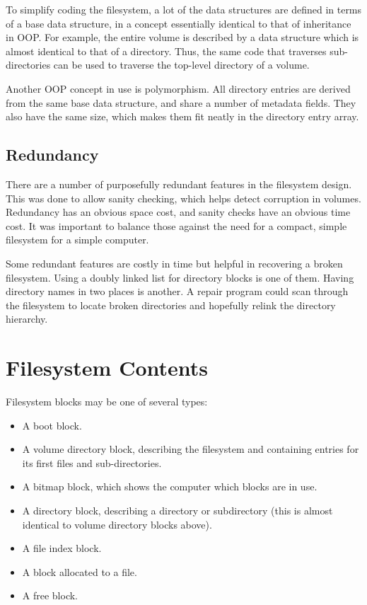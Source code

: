 To simplify coding the filesystem, a lot of the data structures are defined in
terms of a base data structure, in a concept essentially identical to that of
inheritance in \gls{OOP}. For example, the entire volume is
described by a data structure which is almost identical to that of a
directory. Thus, the same code that traverses sub-directories can be used to
traverse the top-level directory of a volume.

Another \gls{OOP} concept in use is polymorphism. All directory entries are
derived from the same base data structure, and share a number of metadata
fields. They also have the same size, which makes them fit neatly in the
directory entry array.

\subsection{Redundancy}

There are a number of purposefully redundant features in the filesystem
design. This was done to allow sanity checking, which helps detect corruption
in volumes. Redundancy has an obvious space cost, and sanity checks have an
obvious time cost. It was important to balance those against the need for a
compact, simple filesystem for a simple computer.

Some redundant features are costly in time but helpful in recovering a broken
filesystem. Using a doubly linked list for directory blocks is one of
them. Having directory names in two places is another. A repair program could
scan through the filesystem to locate broken directories and hopefully relink
the directory hierarchy.

\section{Filesystem Contents}

Filesystem blocks may be one of several types:

\begin{itemize}
\item A boot block.
\item A volume directory block, describing the filesystem and containing
  entries for its first files and sub-directories.
\item A bitmap block, which shows the computer which blocks are in use.
\item A directory block, describing a directory or subdirectory (this is almost
  identical to volume directory blocks above).
\item A file index block.
\item A block allocated to a file.
\item A free block.
\end{itemize}

